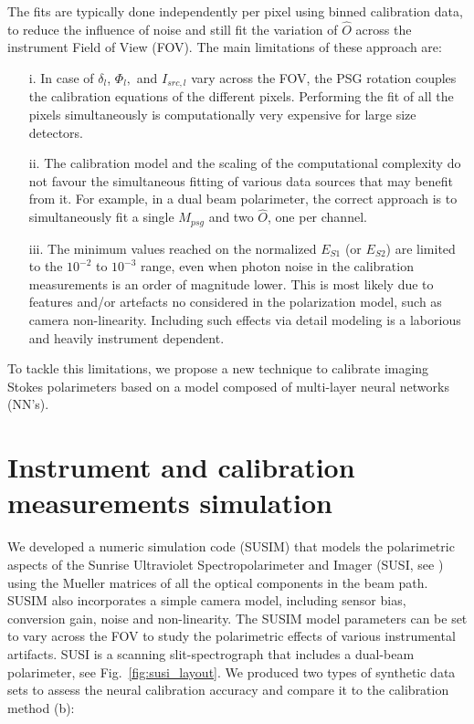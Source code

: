\documentclass[baaa]{baaa}
\begin{document}
The fits are typically done independently per pixel using binned calibration data, to reduce the influence of noise and still fit the variation of $\hat{O}$ across the instrument Field of View (FOV). The main limitations of these approach are:

\begin{itemize}
    \item[i.] In case of $\delta_l$, $\Phi_l,$ and $I_{src,l}$ vary across the FOV, the PSG rotation couples the calibration equations of the different pixels. Performing the fit of all the pixels simultaneously is computationally very expensive for large size detectors. \\
    \item[ii.] The calibration model and the scaling of the computational complexity do not favour the simultaneous fitting of various data sources that may benefit from it. For example, in a dual beam polarimeter, the correct approach is to simultaneously fit a single $M_{psg}$ and two $\hat{O}$, one per channel. \\
    \item[iii.] The minimum values reached on the normalized $E_{S1}$ (or $E_{S2}$) are limited to the $10^{-2}$ to $10^{-3}$ range, even when photon noise in the calibration measurements is an order of magnitude lower. This is most likely due to features and/or artefacts no considered in the polarization model, such as camera non-linearity. Including such effects via detail modeling is a laborious and heavily instrument dependent.\\
\end{itemize}

To tackle this limitations, we propose a new technique to calibrate imaging Stokes polarimeters based on a model composed of multi-layer neural networks (NN's).



\section{Instrument and calibration measurements simulation}

We developed a numeric simulation code {\sc(SUSIM)} that models the polarimetric aspects of the Sunrise Ultraviolet Spectropolarimeter and Imager (SUSI, see \citealt{Feller2020}) using the Mueller matrices of all the optical components in the beam path. {\sc SUSIM} also incorporates a simple camera model, including sensor bias, conversion gain, noise and non-linearity. The {\sc SUSIM} model parameters can be set to vary across the FOV to study the polarimetric effects of various instrumental artifacts. SUSI is a scanning slit-spectrograph that includes a dual-beam polarimeter, see Fig.~\ref{fig:susi_layout}. We produced two types of synthetic data sets to assess the neural calibration accuracy and compare it to the calibration method (b):
\end{document}
